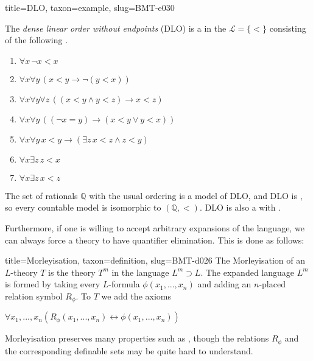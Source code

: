 \documentclass[a4paper]{article}
\begin{document}
  
  
\begin{tree}{title={DLO}, taxon={example}, slug={BMT-e030}}

    The \emph{dense linear order without endpoints} (DLO) is a  in the  \(\mathcal  L= \{ < \}\)
    consisting of the following .
    \begin{enumerate}
\item{\(\forall  x \, \neg  x<x\)}
        \item{\(\forall  x \forall  y \, (x<y \rightarrow \neg (y<x))\)}
        \item{\(\forall  x \forall  y \forall  z \, ((x<y \land  y<z) \rightarrow  x<z)\)}
        \item{\(\forall  x \forall  y \, (( \neg  x=y) \rightarrow (x<y \lor  y<x))\)}
        \item{\(\forall  x \forall  y \, x<y \rightarrow ( \exists  z \, x<z \land  z<y)\)}
        \item{\(\forall  x \exists  z \, z<x\)}
        \item{\(\forall  x \exists  z \, x<z\)}
\end{enumerate}\par{
    The set of rationals \(\mathbb  Q\) with the usual ordering is a model of DLO, and DLO is ,
    so every countable model is isomorphic to \(( \mathbb  Q,<)\). DLO is also a  with
    .
}
\end{tree}

\par{Furthermore, if one is willing to accept arbitrary expansions of the language, we can always force a theory to have quantifier elimination. This is done as follows:}
\begin{tree}{title={Morleyisation}, taxon={definition}, slug={BMT-d026}}
 The Morleyisation of an \(L\)-theory \(T\) is the theory \(T^m\) in the language \(L^m \supset  L\). The expanded language \(L^m\) is formed by taking every \(L\)-formula \(\phi (x_1,...,x_n)\) and adding an \(n\)-placed relation symbol \(R_ \phi\). To \(T\) we add the axioms \par{\(\forall  x_1,...,x_n (R_ \phi  (x_1,...,x_n) \leftrightarrow \phi (x_1,...,x_n)) \)}\par{Morleyisation preserves many properties such as , though the relations \(R_ \phi\) and the corresponding definable sets may be quite hard to understand. }
\end{tree}

\printbibliography
\end{document}
